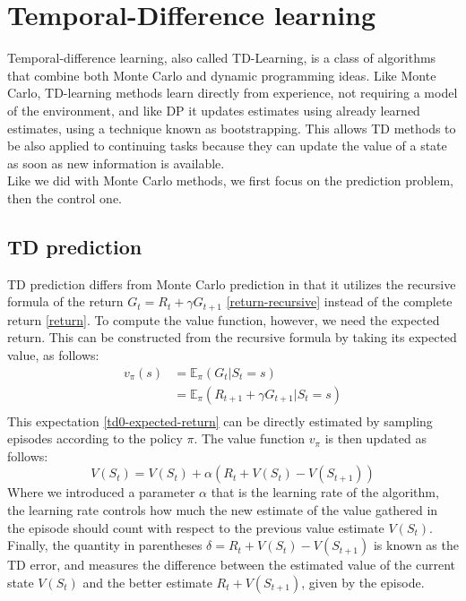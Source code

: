 \section{Temporal-Difference learning}
Temporal-difference learning, also called TD-Learning, is a class of algorithms that combine both Monte Carlo and dynamic programming ideas. Like Monte Carlo, TD-learning methods learn directly from experience, not requiring a model of the environment, and like DP it updates estimates using already learned estimates, using a technique known as bootstrapping. This allows TD methods to be also applied to continuing tasks because they can update the value of a state as soon as new information is available.\\
Like we did with Monte Carlo methods, we first focus on the prediction problem, then the control one.

\subsection{TD prediction}
TD prediction differs from Monte Carlo prediction in that it utilizes the recursive formula of the return $G_t = R_t + \gamma G_{t+1}$ \ref{return-recursive} instead of the complete return \ref{return}. To compute the value function, however, we need the expected return. This can be constructed from the recursive formula by taking its expected value, as follows:
\begin{equation}
    \begin{split}
        v_{\pi}(s) & = \mathds{E}_{\pi}(G_t | S_t = s) \\
        & = \mathds{E}_{\pi}(R_{t+1} + \gamma G_{t+1} | S_t = s)\\
    \end{split}
    \label{td0-expected-return}
\end{equation}
This expectation \ref{td0-expected-return} can be directly estimated by sampling episodes according to the policy $\pi$. The value function $v_{\pi}$ is then updated as follows:
\begin{equation}
    V(S_t) = V(S_t) + \alpha (R_t + V(S_t) - V(S_{t+1}))
    \label{td0-update}
\end{equation}
Where we introduced a parameter $\alpha$ that is the learning rate of the algorithm, the learning rate controls how much the new estimate of the value gathered in the episode should count with respect to the previous value estimate $V(S_t)$.\\
Finally, the quantity in parentheses $\delta = R_t + V(S_t) - V(S_{t+1})$ is known as the TD error, and measures the difference between the estimated value of the current state $V(S_t)$ and the better estimate $R_t + V(S_{t+1})$, given by the episode.\\

